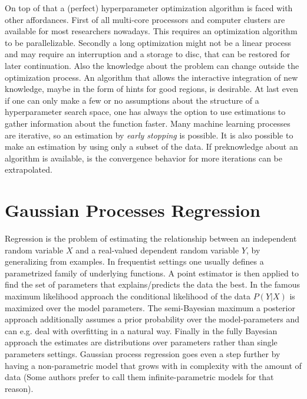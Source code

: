 \documentclass[english]{article}
\begin{document}
On top of that a (perfect) hyperparameter optimization algorithm is faced with other affordances. First of all multi-core processors and computer clusters are available for most researchers nowadays. This requires an optimization algorithm to be parallelizable. Secondly a long optimization might not be a linear process and may require an interruption and a storage to disc, that can be restored for later continuation. Also the knowledge about the problem can change outside the optimization process. An algorithm that allows the interactive integration of new knowledge, maybe in the form of hints for good regions, is desirable.
At last even if one can only make a few or no assumptions about the structure of a hyperparameter search space, one has always the option to use estimations to gather information about the function faster. Many machine learning processes are iterative, so an estimation by \textit{early stopping} is possible. It is also possible to make an estimation by using only a subset of the data. If preknowledge about an algorithm is available, is the convergence behavior for more iterations can be extrapolated.



\section{Gaussian Processes Regression}
\label{GPR}
Regression is the problem of estimating the relationship between an independent random variable $X$ and a real-valued dependent random variable $Y$, by generalizing from examples. In frequentist settings one usually defines a parametrized family of underlying functions. A point estimator is then applied to find the set of parameters that explains/predicts the data the best. In the famous maximum likelihood approach the conditional likelihood of the data $P(Y|X)$ is maximized over the model parameters. The semi-Bayesian maximum a posterior approach additionally assumes a prior probability over the model-parameters and can e.g. deal with overfitting in a natural way. Finally in the fully Bayesian approach the estimates are distributions over parameters rather than single parameters settings. Gaussian process regression goes even a step further by having a non-parametric model that grows with in complexity with the amount of data (Some authors prefer to call them infinite-parametric models for that reason).
\end{document}
